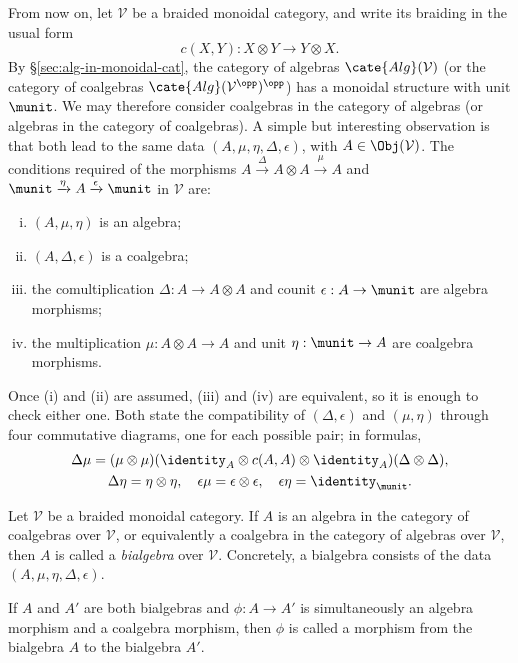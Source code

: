 From now on, let $\mathcal{V}$ be a braided monoidal category, and write its
braiding in the usual form
\[ c(X, Y): X \otimes Y \to Y \otimes X. \]
By \S\ref{sec:alg-in-monoidal-cat}, the category of algebras
$\cate{Alg}(\mathcal{V})$ (or the category of coalgebras
$\cate{Alg}(\mathcal{V}^{\opp})^{\opp}$) has a monoidal structure with unit
$\munit$. We may therefore consider coalgebras in the category of algebras
(or algebras in the category of coalgebras). A simple but interesting
observation is that both lead to the same data
$(A,\mu,\eta,\Delta,\epsilon)$, with $A\in\Obj(\mathcal{V})$. The conditions
required of the morphisms
$A\xrightarrow{\Delta}A\otimes A\xrightarrow{\mu}A$ and
$\munit\xrightarrow{\eta}A\xrightarrow{\epsilon}\munit$ in $\mathcal{V}$
are:
\begin{enumerate}[(i)]
	\item $(A,\mu,\eta)$ is an algebra;
	\item $(A,\Delta,\epsilon)$ is a coalgebra;
	\item the comultiplication $\Delta:A\to A\otimes A$ and counit
	$\epsilon:A\to\munit$ are algebra morphisms;
	\item the multiplication $\mu:A\otimes A\to A$ and unit
	$\eta:\munit\to A$ are coalgebra morphisms.
\end{enumerate}
Once (i) and (ii) are assumed, (iii) and (iv) are equivalent, so it is enough
to check either one. Both state the compatibility of $(\Delta,\epsilon)$ and
$(\mu,\eta)$ through four commutative diagrams, one for each possible pair;
in formulas,
\begin{equation*}\begin{gathered}
	\Delta \mu = (\mu \otimes \mu)(\identity_A \otimes c(A, A) \otimes \identity_A) (\Delta \otimes \Delta), \\
	\Delta \eta = \eta \otimes \eta, \quad \epsilon \mu = \epsilon \otimes \epsilon, \quad \epsilon \eta = \identity_{\munit}.
\end{gathered}\end{equation*}

\begin{definition}[Bialgebra]
	Let $\mathcal{V}$ be a braided monoidal category. If $A$ is an algebra in
	the category of coalgebras over $\mathcal{V}$, or equivalently a coalgebra
	in the category of algebras over $\mathcal{V}$, then $A$ is called a
	\emph{bialgebra} over $\mathcal{V}$. Concretely, a bialgebra consists of
	the data $(A,\mu,\eta,\Delta,\epsilon)$.

	If $A$ and $A'$ are both bialgebras and $\phi:A\to A'$ is simultaneously
	an algebra morphism and a coalgebra morphism, then $\phi$ is called a
	morphism from the bialgebra $A$ to the bialgebra $A'$.
\end{definition}

